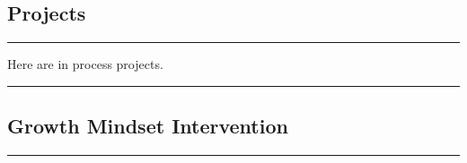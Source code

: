 \documentclass[
]{article}
\author{}
\date{\vspace{-2.5em}}
\begin{document}
{
\setcounter{tocdepth}{4}
\tableofcontents
}
\hypertarget{projects}{%
\subsection{Projects}\label{projects}}

\begin{center}\rule{0.5\linewidth}{0.5pt}\end{center}

Here are in process projects.

\begin{center}\rule{0.5\linewidth}{0.5pt}\end{center}

\hypertarget{growth-mindset-intervention}{%
\subsection{Growth Mindset
Intervention}\label{growth-mindset-intervention}}

\begin{center}\rule{0.5\linewidth}{0.5pt}\end{center}
\end{document}
